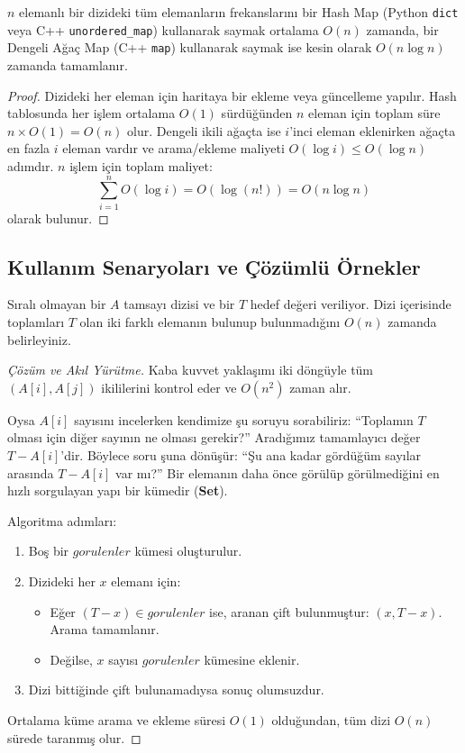 \begin{theorem}
$n$ elemanlı bir dizideki tüm elemanların frekanslarını bir Hash Map (Python \texttt{dict} veya C++ \texttt{unordered\_map}) kullanarak saymak ortalama $O(n)$ zamanda, bir Dengeli Ağaç Map (C++ \texttt{map}) kullanarak saymak ise kesin olarak $O(n \log n)$ zamanda tamamlanır.
\end{theorem}

\begin{proof}
Dizideki her eleman için haritaya bir ekleme veya güncelleme yapılır. Hash tablosunda her işlem ortalama $O(1)$ sürdüğünden $n$ eleman için toplam süre $n \times O(1) = O(n)$ olur. Dengeli ikili ağaçta ise $i$'inci eleman eklenirken ağaçta en fazla $i$ eleman vardır ve arama/ekleme maliyeti $O(\log i) \le O(\log n)$ adımdır. $n$ işlem için toplam maliyet:
\[ \sum_{i=1}^n O(\log i) = O(\log(n!)) = O(n \log n) \]
olarak bulunur.
\end{proof}

\subsection{Kullanım Senaryoları ve Çözümlü Örnekler}

\begin{example}
Sıralı olmayan bir $A$ tamsayı dizisi ve bir $T$ hedef değeri veriliyor. Dizi içerisinde toplamları $T$ olan iki farklı elemanın bulunup bulunmadığını $O(n)$ zamanda belirleyiniz.
\end{example}

\begin{proof}[Çözüm ve Akıl Yürütme]
Kaba kuvvet yaklaşımı iki döngüyle tüm $(A[i], A[j])$ ikililerini kontrol eder ve $O(n^2)$ zaman alır. 

Oysa $A[i]$ sayısını incelerken kendimize şu soruyu sorabiliriz: ``Toplamın $T$ olması için diğer sayının ne olması gerekir?'' Aradığımız tamamlayıcı değer $T - A[i]$'dir. Böylece soru şuna dönüşür: ``Şu ana kadar gördüğüm sayılar arasında $T - A[i]$ var mı?'' Bir elemanın daha önce görülüp görülmediğini en hızlı sorgulayan yapı bir kümedir (\textbf{Set}).

Algoritma adımları:
\begin{enumerate}
    \item Boş bir $gorulenler$ kümesi oluşturulur.
    \item Dizideki her $x$ elemanı için:
    \begin{itemize}
        \item Eğer $(T - x) \in gorulenler$ ise, aranan çift bulunmuştur: $(x, T - x)$. Arama tamamlanır.
        \item Değilse, $x$ sayısı $gorulenler$ kümesine eklenir.
    \end{itemize}
    \item Dizi bittiğinde çift bulunamadıysa sonuç olumsuzdur.
\end{enumerate}
Ortalama küme arama ve ekleme süresi $O(1)$ olduğundan, tüm dizi $O(n)$ sürede taranmış olur.
\end{proof}

